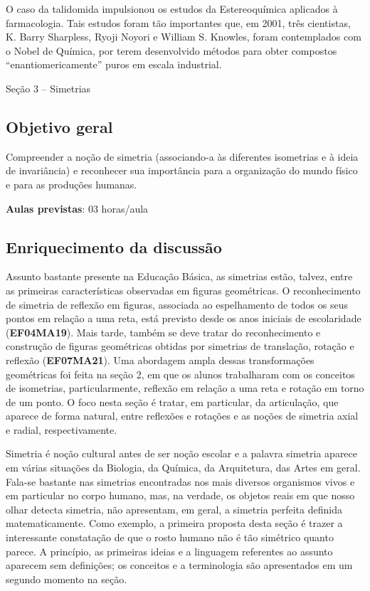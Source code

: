 O caso da talidomida impulsionou os estudos da Estereoquímica aplicados à farmacologia. Tais estudos foram tão importantes que, em 2001, três cientistas, K. Barry Sharpless, Ryoji Noyori e William S. Knowles, foram contemplados com o Nobel de Química, por terem desenvolvido métodos para obter compostos “enantiomericamente” puros em escala industrial.



\begin{paginatexto}{Seção 3 -- Simetrias}

\subsection{Objetivo geral}
Compreender a noção de simetria (associando-a às diferentes isometrias e à ideia de invariância) e reconhecer sua importância para a organização do mundo físico e para as produções humanas.

\textbf{Aulas previstas}: 03 horas/aula

\subsection{Enriquecimento da discussão}

Assunto bastante presente na Educação Básica, as simetrias estão, talvez, entre as primeiras características observadas em figuras geométricas. O reconhecimento de simetria de reflexão em figuras, associada ao espelhamento de todos os seus pontos em relação a uma reta, está previsto desde os anos iniciais de escolaridade (\textbf{EF04MA19}). Mais tarde, também se deve tratar do reconhecimento e construção de figuras geométricas obtidas por simetrias de translação, rotação e reflexão (\textbf{EF07MA21}). Uma abordagem ampla dessas transformações geométricas foi feita na seção 2, em que os alunos trabalharam com os conceitos de isometrias, particularmente, reflexão em relação a uma reta e rotação em torno de um ponto. O foco nesta seção é tratar, em particular, da articulação, que aparece de forma natural, entre reflexões e rotações e as noções de simetria axial e radial, respectivamente.

Simetria é noção cultural antes de ser noção escolar e a palavra simetria aparece em várias situações da Biologia, da Química, da Arquitetura, das Artes em geral. Fala-se bastante nas simetrias encontradas nos mais diversos organismos vivos e em particular no corpo humano, mas, na verdade, os objetos reais em que nosso olhar detecta simetria, não apresentam, em geral, a simetria perfeita definida matematicamente. Como exemplo, a primeira proposta desta seção é trazer a interessante constatação de que o rosto humano não é tão simétrico quanto parece. A princípio, as primeiras ideias e a linguagem referentes ao assunto aparecem sem definições; os conceitos e a terminologia são apresentados em um segundo momento na seção. 


\end{paginatexto}
